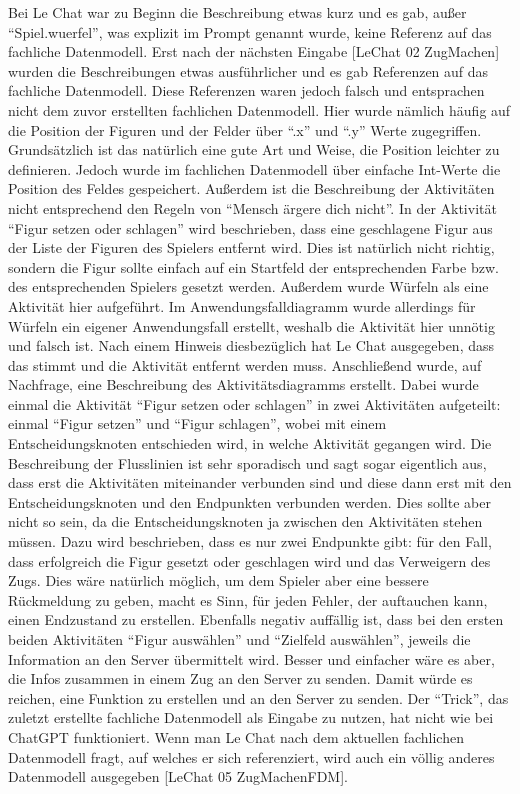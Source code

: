 Bei Le Chat war zu Beginn die Beschreibung etwas kurz und es gab, außer ``Spiel.wuerfel'', was explizit im Prompt genannt wurde, keine 
Referenz auf das fachliche Datenmodell. Erst nach der nächsten Eingabe [LeChat 02 ZugMachen] wurden die Beschreibungen etwas ausführlicher 
und es gab Referenzen auf das fachliche Datenmodell. Diese Referenzen waren jedoch falsch und entsprachen nicht dem zuvor erstellten 
fachlichen Datenmodell. Hier wurde nämlich häufig auf die Position der Figuren und der Felder über ``.x'' und ``.y'' Werte zugegriffen. 
Grundsätzlich ist das natürlich eine gute Art und Weise, die Position leichter zu definieren. Jedoch wurde im fachlichen Datenmodell über 
einfache Int-Werte die Position des Feldes gespeichert. Außerdem ist die Beschreibung der Aktivitäten nicht entsprechend den Regeln von 
``Mensch ärgere dich nicht''. In der Aktivität ``Figur setzen oder schlagen'' wird beschrieben, dass eine geschlagene Figur aus der Liste der 
Figuren des Spielers entfernt wird. Dies ist natürlich nicht richtig, sondern die Figur sollte einfach auf ein Startfeld der entsprechenden 
Farbe bzw. des entsprechenden Spielers gesetzt werden. Außerdem wurde Würfeln als eine Aktivität hier aufgeführt. Im Anwendungsfalldiagramm 
wurde allerdings für Würfeln ein eigener Anwendungsfall erstellt, weshalb die Aktivität hier unnötig und falsch ist. Nach einem Hinweis 
diesbezüglich hat Le Chat ausgegeben, dass das stimmt und die Aktivität entfernt werden muss. Anschließend wurde, auf Nachfrage, eine 
Beschreibung des Aktivitätsdiagramms erstellt. Dabei wurde einmal die Aktivität ``Figur setzen oder schlagen'' in zwei Aktivitäten aufgeteilt: 
einmal ``Figur setzen'' und ``Figur schlagen'', wobei mit einem Entscheidungsknoten entschieden wird, in welche Aktivität gegangen wird. Die 
Beschreibung der Flusslinien ist sehr sporadisch und sagt sogar eigentlich aus, dass erst die Aktivitäten miteinander verbunden sind und 
diese dann erst mit den Entscheidungsknoten und den Endpunkten verbunden werden. Dies sollte aber nicht so sein, da die Entscheidungsknoten 
ja zwischen den Aktivitäten stehen müssen. Dazu wird beschrieben, dass es nur zwei Endpunkte gibt: für den Fall, dass erfolgreich die Figur 
gesetzt oder geschlagen wird und das Verweigern des Zugs. Dies wäre natürlich möglich, um dem Spieler aber eine bessere Rückmeldung zu geben, 
macht es Sinn, für jeden Fehler, der auftauchen kann, einen Endzustand zu erstellen. Ebenfalls negativ auffällig ist, dass bei den ersten 
beiden Aktivitäten ``Figur auswählen'' und ``Zielfeld auswählen'', jeweils die Information an den Server übermittelt wird. Besser und einfacher 
wäre es aber, die Infos zusammen in einem Zug an den Server zu senden. Damit würde es reichen, eine Funktion zu erstellen und an den Server 
zu senden. Der ``Trick'', das zuletzt erstellte fachliche Datenmodell als Eingabe zu nutzen, hat nicht wie bei ChatGPT funktioniert. Wenn man 
Le Chat nach dem aktuellen fachlichen Datenmodell fragt, auf welches er sich referenziert, wird auch ein völlig anderes Datenmodell ausgegeben 
[LeChat 05 ZugMachenFDM].


